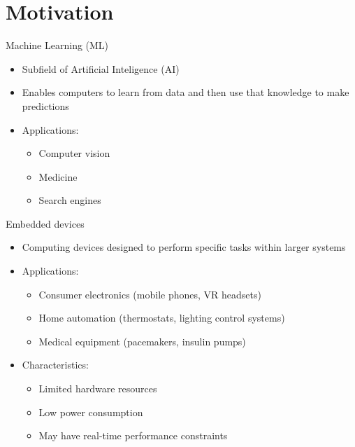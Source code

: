
\section{Motivation}

\begin{frame}{Machine Learning (ML)}
  \begin{itemize}
	\item Subfield of Artificial Inteligence (AI)
	\item Enables computers to learn from data and then use that knowledge to
	make predictions
	\item Applications:
	  \begin{itemize}
		\item Computer vision
		\item Medicine
		\item Search engines
	  \end{itemize}
  \end{itemize}
\end{frame}

\begin{frame}{Embedded devices}
  \begin{itemize}
	\item Computing devices designed to perform specific tasks within larger systems
	\item Applications:
	  \begin{itemize}
		\item Consumer electronics (mobile phones, VR headsets)
		\item Home automation (thermostats, lighting control systems)
		\item Medical equipment (pacemakers, insulin pumps)
	  \end{itemize}
	\item Characteristics:
	  \begin{itemize}
		\item Limited hardware resources
		\item Low power consumption
		\item May have real-time performance constraints
	  \end{itemize}
  \end{itemize}
\end{frame}

